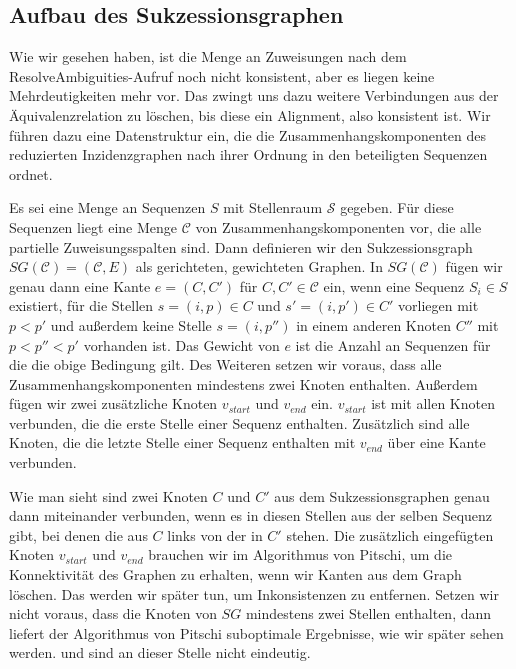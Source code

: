\subsection{Aufbau des Sukzessionsgraphen}

Wie wir gesehen haben, ist die Menge an Zuweisungen nach dem \textrm{ResolveAmbiguities}-Aufruf noch nicht konsistent, aber es liegen keine Mehrdeutigkeiten mehr vor. Das zwingt uns dazu weitere Verbindungen aus der Äquivalenzrelation zu löschen, bis diese ein Alignment, also konsistent ist. Wir führen dazu eine Datenstruktur ein, die die Zusammenhangskomponenten des reduzierten Inzidenzgraphen nach ihrer Ordnung in den beteiligten Sequenzen ordnet.

\begin{definition}[Sukzessionsgraph]
	Es sei eine Menge an Sequenzen $S$ mit Stellenraum $\mathcal{S}$ gegeben. Für diese Sequenzen liegt eine Menge $\mathcal{C}$ von Zusammenhangskomponenten vor, die alle partielle Zuweisungsspalten sind. Dann definieren wir den Sukzessionsgraph $SG(\mathcal{C}) = (\mathcal{C},E)$ als gerichteten, gewichteten Graphen. In $SG(\mathcal{C})$ fügen wir genau dann eine Kante $e = (C,C')$ für $C,C' \in \mathcal{C}$ ein, wenn eine Sequenz $S_i \in S$ existiert, für die Stellen $s = (i,p) \in C$ und $s' = (i,p') \in C'$ vorliegen mit $p < p'$ und außerdem keine Stelle $s = (i,p'')$ in einem anderen Knoten $C''$ mit $p < p'' < p'$ vorhanden ist. Das Gewicht von $e$ ist die Anzahl an Sequenzen für die die obige Bedingung gilt. Des Weiteren setzen wir voraus, dass alle Zusammenhangskomponenten mindestens zwei Knoten enthalten.
	Außerdem fügen wir zwei zusätzliche Knoten $v_{start}$ und $v_{end}$ ein. $v_{start}$ ist mit allen Knoten verbunden, die die erste Stelle einer Sequenz enthalten. Zusätzlich sind alle Knoten, die die letzte Stelle einer Sequenz enthalten mit $v_{end}$ über eine Kante verbunden.
\end{definition}


Wie man sieht sind zwei Knoten $C$ und $C'$ aus dem Sukzessionsgraphen genau dann miteinander verbunden, wenn es in diesen Stellen aus der selben Sequenz gibt, bei denen die aus $C$ links von der in $C'$ stehen. Die zusätzlich eingefügten Knoten $v_{start}$ und $v_{end}$ brauchen wir im Algorithmus von Pitschi, um die Konnektivität des Graphen zu erhalten, wenn wir Kanten aus dem Graph löschen. Das werden wir später tun, um Inkonsistenzen zu entfernen. Setzen wir nicht voraus, dass die Knoten von $SG$ mindestens zwei Stellen enthalten, dann liefert der Algorithmus von Pitschi suboptimale Ergebnisse, wie wir später sehen werden. \cite{cpm10} und \cite{pdc10} sind an dieser Stelle nicht eindeutig. 


